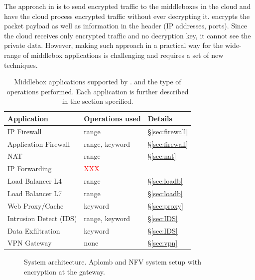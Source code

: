     The approach in \sys is to send encrypted traffic to the middleboxes in the cloud and have the cloud process encrypted traffic without ever decrypting it. \sys encrypts the packet payload as well as information in the header (IP addresses, ports). Since the cloud receives only encrypted traffic and no decryption key, it cannot see the private data. However, making such approach in a practical way for the wide-range of middlebox applications is challenging and requires a set of new techniques.
    
    
    
    
\begin{table}[t!]
\centering
\begin{tabular}{p{3.2cm}|p{2.9cm}|p{1cm}}
{\bf Application}  & {\bf Operations used} & {\bf Details} \\
\hline \hline
IP Firewall &   range  & \S\ref{sec:firewall} \\
Application Firewall & range, keyword  & \S\ref{sec:firewall}\\
NAT & range  & \S\ref{sec:nat} \\
IP Forwarding  & \textcolor{red}{XXX} & \\
Load Balancer L4 & range & \S\ref{sec:loadb}\\
Load Balancer L7  & range & \S\ref{sec:loadb}\\
Web Proxy/Cache  & keyword & \S\ref{sec:proxy}\\
Intrusion Detect (IDS)  & range, keyword & \S\ref{sec:IDS}\\
Data Exfiltration  & keyword & \S\ref{sec:IDS} \\
VPN Gateway &  none & \S\ref{sec:vpn} \\ 
\end{tabular}
\caption{Middlebox applications supported by \sys. \label{tab:apps} and the type of operations performed. Each application is further described in the section specified. }
\end{table}


\begin{figure}[t!]
\centering
{}
%
\hfill  
{}
     
\caption{System architecture. Aplomb and NFV system setup with \sys encryption  at the gateway. \label{fig:sys-overview}}
\end{figure}

